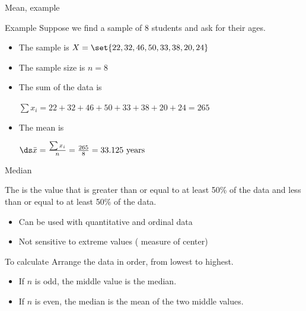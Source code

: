 \documentclass[xcolor=table]{beamer}
\begin{document}
\begin{frame}{Mean, example}
\begin{exampleblock}{Example}
Suppose we find a sample of 8 students and ask for their ages. 

\begin{itemize}
\item The sample is $X = \set{22, 32, 46, 50, 33, 38, 20, 24}$
\pause\item The sample size is $n=8$
\pause
\item The sum of the data is\\
\smallskip
{\centering
$\sum x_i = 22 + 32 + 46 + 50 + 33 +  38 + 20 + 24 = 265$
\par}
\pause
\item The mean is\\
\smallskip
{\centering
$\ds \bar x = \frac {\sum x_i}{n} = \frac {265} 8 = 33.125 \text{ years}$
\par}
\end{itemize}
\smallskip
\end{exampleblock}
\end{frame}

\begin{frame}{Median}
\begin{block}{}
The  is the value that is greater than or equal to at least 50\% of the data and less than or equal to at least 50\% of the data.
\begin{itemize}
\item Can be used with quantitative and ordinal data
\item Not sensitive to extreme values ( measure of center)
\end{itemize}
\end{block}

\pause
\begin{block}{To calculate}
Arrange the data in order, from lowest to highest.
\begin{itemize}
\item If $n$ is odd, the middle value is the median.
\item If $n$ is even, the median is the mean of the two middle values.
\end{itemize}
\end{block}
\end{frame}
\end{document}
